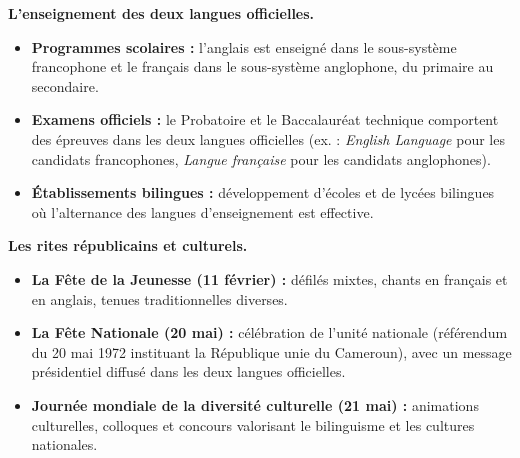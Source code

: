 \documentclass[11pt]{article}
\begin{document}
\textbf{L'enseignement des deux langues officielles.}\par
\begin{itemize}
    \item \textbf{Programmes scolaires :} l'anglais est enseigné dans le sous-système francophone et le français dans le sous-système anglophone, du primaire au secondaire.
    \item \textbf{Examens officiels :} le Probatoire et le Baccalauréat technique comportent des épreuves dans les deux langues officielles (ex. : \emph{English Language} pour les candidats francophones, \emph{Langue française} pour les candidats anglophones).
    \item \textbf{Établissements bilingues :} développement d'écoles et de lycées bilingues où l'alternance des langues d'enseignement est effective.
\end{itemize}

\textbf{Les rites républicains et culturels.}\par
\begin{itemize}
    \item \textbf{La Fête de la Jeunesse (11 février) :} défilés mixtes, chants en français et en anglais, tenues traditionnelles diverses.
    \item \textbf{La Fête Nationale (20 mai) :} célébration de l'unité nationale (référendum du 20 mai 1972 instituant la République unie du Cameroun), avec un message présidentiel diffusé dans les deux langues officielles.
    \item \textbf{Journée mondiale de la diversité culturelle (21 mai) :} animations culturelles, colloques et concours valorisant le bilinguisme et les cultures nationales.
\end{itemize}
\end{document}
